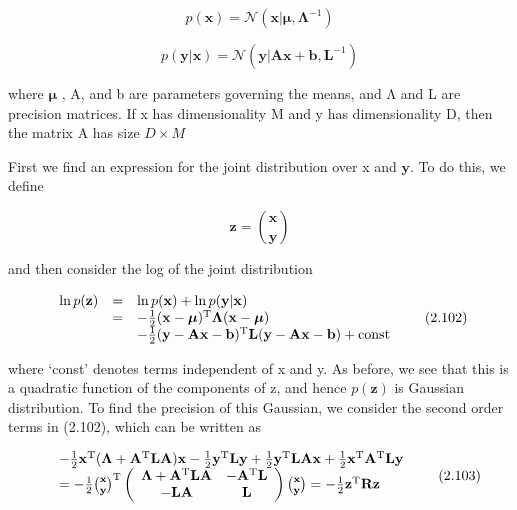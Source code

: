 \documentclass[
  10
]{article}
\begin{document}
\[
p (\mathbf {x}) = \mathcal {N} \left(\mathbf {x} | \boldsymbol {\mu}, \boldsymbol {\Lambda} ^ {- 1}\right)\tag{2.99}
\]

\[
p (\mathbf {y} | \mathbf {x}) = \mathcal {N} \left(\mathbf {y} | \mathbf {A x} + \mathbf {b}, \mathbf {L} ^ {- 1}\right)\tag{2.100}
\]

where \(\pmb { \mu }\) , A, and b are parameters governing the means,
and Λ and L are precision matrices. If x has dimensionality M and y has
dimensionality D, then the matrix A has size \(D \times M\)

First we find an expression for the joint distribution over x and
\(\mathbf { y } .\) To do this, we define

\[
\mathbf {z} = \binom{\mathbf {x}}{\mathbf {y}}\tag{2.101}
\]

and then consider the log of the joint distribution

\[
\begin{array}{r c l} \ln p (\mathbf {z}) & = & \ln p (\mathbf {x}) + \ln p (\mathbf {y} | \mathbf {x}) \\ & = & - \frac {1}{2} (\mathbf {x} - \boldsymbol {\mu}) ^ {\mathrm{T}} \boldsymbol {\Lambda} (\mathbf {x} - \boldsymbol {\mu}) \\ & & - \frac {1}{2} (\mathbf {y} - \mathbf {A x} - \mathbf {b}) ^ {\mathrm{T}} \mathbf {L} (\mathbf {y} - \mathbf {A x} - \mathbf {b}) + \mathrm{const} \end{array}\tag{2.102}
\]

where `const' denotes terms independent of x and y. As before, we see
that this is a quadratic function of the components of z, and hence
\(p ( \mathbf { z } )\) is Gaussian distribution. To find the precision
of this Gaussian, we consider the second order terms in (2.102), which
can be written as

\[
\begin{array}{r l} & - \frac {1}{2} \mathbf {x} ^ {\mathrm{T}} (\boldsymbol {\Lambda} + \mathbf {A} ^ {\mathrm{T}} \mathbf {L A}) \mathbf {x} - \frac {1}{2} \mathbf {y} ^ {\mathrm{T}} \mathbf {L y} + \frac {1}{2} \mathbf {y} ^ {\mathrm{T}} \mathbf {L A x} + \frac {1}{2} \mathbf {x} ^ {\mathrm{T}} \mathbf {A} ^ {\mathrm{T}} \mathbf {L y} \\ & = - \frac {1}{2} \binom {\mathbf {x}} {\mathbf {y}} ^ {\mathrm{T}} \left( \begin{array}{c c} \boldsymbol {\Lambda} + \mathbf {A} ^ {\mathrm{T}} \mathbf {L A} & - \mathbf {A} ^ {\mathrm{T}} \mathbf {L} \\ - \mathbf {L A} & \mathbf {L} \end{array} \right) \binom {\mathbf {x}} {\mathbf {y}} = - \frac {1}{2} \mathbf {z} ^ {\mathrm{T}} \mathbf {R z} \end{array}\tag{2.103}
\]
\end{document}

